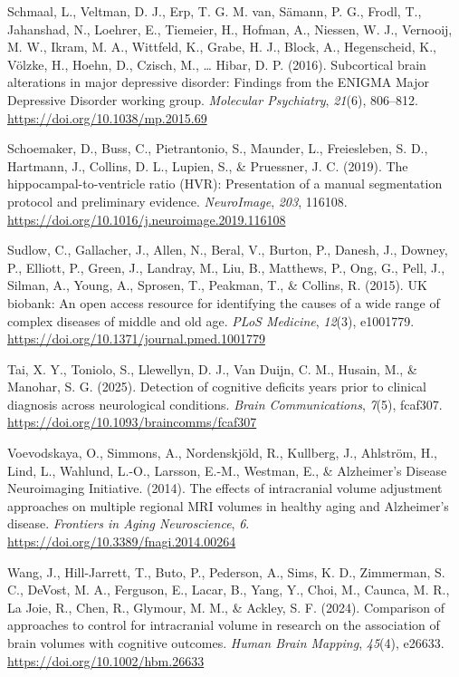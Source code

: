 \documentclass[
]{article}
\newlength{\cslhangindent}
\newenvironment{CSLReferences}[2] %
 {\begin{list}{}{%
  \setlength{\itemindent}{0pt}
  \setlength{\leftmargin}{0pt}
  \setlength{\parsep}{0pt}
  \ifodd #1
   \setlength{\leftmargin}{\cslhangindent}
   \setlength{\itemindent}{-1\cslhangindent}
  \fi
  \setlength{\itemsep}{#2\baselineskip}}}
 {\end{list}}
\begin{document}
\begin{CSLReferences}{1}{0}
Schmaal, L., Veltman, D. J., Erp, T. G. M. van, Sämann, P. G., Frodl,
T., Jahanshad, N., Loehrer, E., Tiemeier, H., Hofman, A., Niessen, W.
J., Vernooij, M. W., Ikram, M. A., Wittfeld, K., Grabe, H. J., Block,
A., Hegenscheid, K., Völzke, H., Hoehn, D., Czisch, M., \ldots{} Hibar,
D. P. (2016). Subcortical brain alterations in major depressive
disorder: Findings from the {ENIGMA} {Major} {Depressive} {Disorder}
working group. \emph{Molecular Psychiatry}, \emph{21}(6), 806--812.
\url{https://doi.org/10.1038/mp.2015.69}

Schoemaker, D., Buss, C., Pietrantonio, S., Maunder, L., Freiesleben, S.
D., Hartmann, J., Collins, D. L., Lupien, S., \& Pruessner, J. C.
(2019). The hippocampal-to-ventricle ratio ({HVR}): {Presentation} of a
manual segmentation protocol and preliminary evidence.
\emph{NeuroImage}, \emph{203}, 116108.
\url{https://doi.org/10.1016/j.neuroimage.2019.116108}

Sudlow, C., Gallacher, J., Allen, N., Beral, V., Burton, P., Danesh, J.,
Downey, P., Elliott, P., Green, J., Landray, M., Liu, B., Matthews, P.,
Ong, G., Pell, J., Silman, A., Young, A., Sprosen, T., Peakman, T., \&
Collins, R. (2015). {UK} biobank: An open access resource for
identifying the causes of a wide range of complex diseases of middle and
old age. \emph{PLoS Medicine}, \emph{12}(3), e1001779.
\url{https://doi.org/10.1371/journal.pmed.1001779}

Tai, X. Y., Toniolo, S., Llewellyn, D. J., Van Duijn, C. M., Husain, M.,
\& Manohar, S. G. (2025). Detection of cognitive deficits years prior to
clinical diagnosis across neurological conditions. \emph{Brain
Communications}, \emph{7}(5), fcaf307.
\url{https://doi.org/10.1093/braincomms/fcaf307}

Voevodskaya, O., Simmons, A., Nordenskjöld, R., Kullberg, J., Ahlström,
H., Lind, L., Wahlund, L.-O., Larsson, E.-M., Westman, E., \&
Alzheimer's Disease Neuroimaging Initiative. (2014). The effects of
intracranial volume adjustment approaches on multiple regional {MRI}
volumes in healthy aging and {Alzheimer}'s disease. \emph{Frontiers in
Aging Neuroscience}, \emph{6}.
\url{https://doi.org/10.3389/fnagi.2014.00264}

Wang, J., Hill-Jarrett, T., Buto, P., Pederson, A., Sims, K. D.,
Zimmerman, S. C., DeVost, M. A., Ferguson, E., Lacar, B., Yang, Y.,
Choi, M., Caunca, M. R., La Joie, R., Chen, R., Glymour, M. M., \&
Ackley, S. F. (2024). Comparison of approaches to control for
intracranial volume in research on the association of brain volumes with
cognitive outcomes. \emph{Human Brain Mapping}, \emph{45}(4), e26633.
\url{https://doi.org/10.1002/hbm.26633}


\end{CSLReferences}
\end{document}
